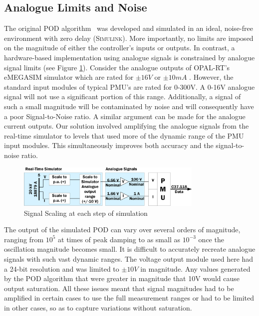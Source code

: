 \documentclass[journal]{IEEEtran}
\begin{document}
\subsection{Analogue Limits and Noise}
The original POD algorithm~\cite{PhasorPOD} was developed and simulated in an ideal, noise-free environment with zero delay (\textsc{Simulink}). More importantly, no limits are imposed on the magnitude of either the controller's inputs or outputs. In contrast, a hardware-based implementation using analogue signals is constrained by analogue signal limits (see Figure \ref{ScalingProblem}). Consider the analogue outputs of OPAL-RT's eMEGASIM simulator which are rated for $\pm16V$ or $\pm10mA$  \cite{eMEGASIM}.
However, the standard input modules of typical PMU's are rated for 0-300V. A 0-16V analogue signal will not use a significant portion of this range. Additionally, a signal of such a small magnitude will be contaminated by noise and will consequently have a poor Signal-to-Noise ratio. A similar argument can be made for the analogue current outputs. Our solution involved amplifying the analogue signals from the real-time simulator to levels that used more of the dynamic range of the PMU input modules. This simultaneously improves both accuracy and the signal-to-noise ratio.

\begin{figure}[tphb]
\centering
\includegraphics[width=3.5in]{Scaling.png}
\vspace{-1.3em}
\caption{Signal Scaling at each step of simulation}
\label{ScalingProblem}
\end{figure}
\vspace{-0.4em}
The output of the simulated POD can vary over several orders of magnitude, ranging from $10^{5}$ at times of peak damping to as small as $10^{-3}$ once the oscillation magnitude  becomes small. It is difficult to accurately recreate analogue signals with such vast dynamic ranges. The voltage output module used here had a 24-bit resolution and was limited to $\pm 10V$ in magnitude. Any values generated by the POD algorithm that were greater in magnitude that 10V would cause output saturation. All these issues meant that signal magnitudes had to be amplified in certain cases to use the full measurement ranges or had to be limited in other cases, so as to capture variations without saturation.
\end{document}
